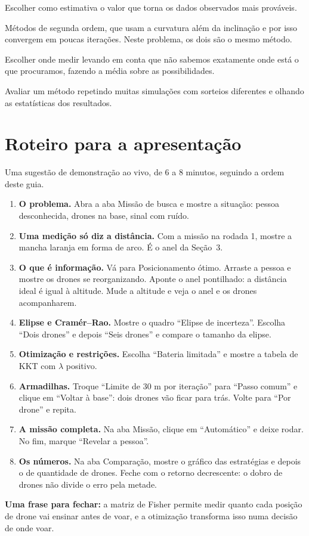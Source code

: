 \documentclass[11pt,a4paper]{article}
\begin{document}
\begin{description}[style=nextline,leftmargin=0pt,itemsep=0.45em,font=\normalfont\bfseries]
  \item[Máxima verossimilhança] Escolher como estimativa o valor que torna os dados observados mais prováveis.
  \item[Gauss--Newton e Fisher scoring] Métodos de segunda ordem, que usam a curvatura além da inclinação e por isso convergem em poucas iterações. Neste problema, os dois são o mesmo método.
  \item[Projeto bayesiano (critério robusto)] Escolher onde medir levando em conta que não sabemos exatamente onde está o que procuramos, fazendo a média sobre as possibilidades.
  \item[Monte Carlo] Avaliar um método repetindo muitas simulações com sorteios diferentes e olhando as estatísticas dos resultados.
\end{description}

\section{Roteiro para a apresentação}

Uma sugestão de demonstração ao vivo, de 6 a 8 minutos, seguindo a ordem deste guia.

\begin{enumerate}[itemsep=0.5em]
  \item \textbf{O problema.} Abra a aba Missão de busca e mostre a situação: pessoa desconhecida, drones na base, sinal com ruído.
  \item \textbf{Uma medição só diz a distância.} Com a missão na rodada 1, mostre a mancha laranja em forma de arco. É o anel da Seção~3.
  \item \textbf{O que é informação.} Vá para Posicionamento ótimo. Arraste a pessoa e mostre os drones se reorganizando. Aponte o anel pontilhado: a distância ideal é igual à altitude. Mude a altitude e veja o anel e os drones acompanharem.
  \item \textbf{Elipse e Cramér--Rao.} Mostre o quadro \enquote{Elipse de incerteza}. Escolha \enquote{Dois drones} e depois \enquote{Seis drones} e compare o tamanho da elipse.
  \item \textbf{Otimização e restrições.} Escolha \enquote{Bateria limitada} e mostre a tabela de KKT com $\lambda$ positivo.
  \item \textbf{Armadilhas.} Troque \enquote{Limite de 30 m por iteração} para \enquote{Passo comum} e clique em \enquote{Voltar à base}: dois drones vão ficar para trás. Volte para \enquote{Por drone} e repita.
  \item \textbf{A missão completa.} Na aba Missão, clique em \enquote{Automático} e deixe rodar. No fim, marque \enquote{Revelar a pessoa}.
  \item \textbf{Os números.} Na aba Comparação, mostre o gráfico das estratégias e depois o de quantidade de drones. Feche com o retorno decrescente: o dobro de drones não divide o erro pela metade.
\end{enumerate}

\begin{ideia}
\textbf{Uma frase para fechar:} a matriz de Fisher permite medir quanto cada posição de drone vai ensinar antes de voar, e a otimização transforma isso numa decisão de onde voar.
\end{ideia}
\end{document}
